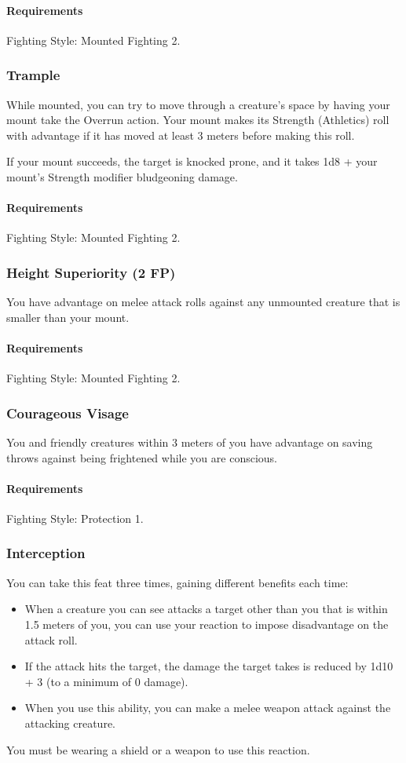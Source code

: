     \paragraph{Requirements} Fighting Style: Mounted Fighting 2.
\subsubsection{Trample} \label{feat::trample}
    While mounted, you can try to move through a creature's space by having your mount take the Overrun action.
    Your mount makes its Strength (Athletics) roll with advantage if it has moved at least 3 meters before making this roll.

    If your mount succeeds, the target is knocked prone, and it takes 1d8 + your mount's Strength modifier bludgeoning damage.
    \paragraph{Requirements} Fighting Style: Mounted Fighting 2.
\subsubsection{Height Superiority (2 FP)} \label{feat::heightsuperiority}
    You have advantage on melee attack rolls against any unmounted creature that is smaller than your mount.
    \paragraph{Requirements} Fighting Style: Mounted Fighting 2.
\subsubsection{Courageous Visage} \label{feat::courageousvisage}
    You and friendly creatures within 3 meters of you have advantage on saving throws against being frightened while you are conscious.
    \paragraph{Requirements} Fighting Style: Protection 1.
\subsubsection{Interception} \label{feat::interception}
    You can take this feat three times, gaining different benefits each time:
    \begin{itemize}
        \item When a creature you can see attacks a target other than you that is within 1.5 meters of you, you can use your reaction to impose disadvantage on the attack roll.
        \item If the attack hits the target, the damage the target takes is reduced by 1d10 + 3 (to a minimum of 0 damage).
        \item When you use this ability, you can make a melee weapon attack against the attacking creature.
    \end{itemize}
    You must be wearing a shield or a weapon to use this reaction.
